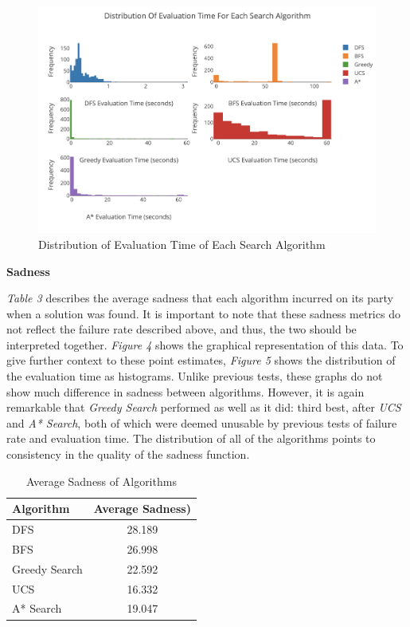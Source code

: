 \documentclass[11pt]{article}
\begin{document}
\begin{figure}[!h]
\centering
\includegraphics[width=\textwidth]{time_hist.png}
\caption{Distribution of Evaluation Time of Each Search Algorithm}
\end{figure}

\textbf{Sadness}

\textit{Table 3} describes the average sadness that each algorithm incurred on its party when a solution was found. It is important to note that these sadness metrics do not reflect the failure rate described above, and thus, the two should be interpreted together. \textit{Figure 4} shows the graphical representation of this data. To give further context to these point estimates, \textit{Figure 5} shows the distribution of the evaluation time as histograms. Unlike previous tests, these graphs do not show much difference in sadness between algorithms. However, it is again remarkable that \textit{Greedy Search} performed as well as it did: third best, after \textit{UCS} and \textit{A* Search}, both of which were deemed unusable by previous tests of failure rate and evaluation time. The distribution of all of the algorithms points to consistency in the quality of the sadness function.

\begin{table}[!h]
  \centering
  \begin{tabular}{l c}
    \toprule
    Algorithm & Average Sadness) \\
    \midrule
    DFS & 28.189 \\
    BFS & 26.998 \\
    Greedy Search & 22.592 \\
    UCS & 16.332 \\
    A* Search & 19.047 \\
    \bottomrule
  \end{tabular}
  \caption{Average Sadness of Algorithms}
\end{table}
\end{document}
